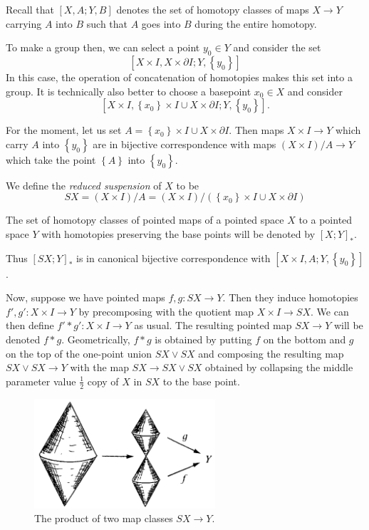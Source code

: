 Recall that $\left[ X,A ; Y ,B \right] $ denotes the
set of homotopy classes of maps $X \to Y$ carrying $A$ into
$B$ such that $A$ goes into $B$ during the entire homotopy.

To make a group then, we can select a point $y_0 \in Y$ and
consider the set
\[
\left[ X \times I, X \times \partial I ;
Y , \left\{ y_0 \right\} \right] 
\] 
In this case, the operation of concatenation of homotopies
makes this set into a group.
It is technically also better to choose a basepoint 
$x_0 \in X$ and consider
\[
\left[ X \times I, \left\{ x_0 \right\} \times I
\cup X \times \partial I ; Y , \left\{ y_0 \right\} \right] .
\] 

For the moment, let us set
$A = \left\{ x_0 \right\} \times I \cup 
X \times \partial I$. Then maps
$X \times I \to Y$ which carry $A$ into $\left\{ y_0 \right\} $ 
are in bijective correspondence with maps 
$\left( X \times I \right) / A \to Y$ which take
 the point $\left\{ A \right\} $ into 
 $\left\{ y_0 \right\} $. 
 
 \begin{definition}
     We define the \textit{reduced suspension} of
     $X$ to be
     \[
     SX = (X \times I) / A =
     \left( X \times I \right) /
     \left( \left\{ x_0 \right\} \times I
     \cup X \times \partial I \right) 
     \] 
 \end{definition}

 The set of homotopy classes of pointed maps
 of a pointed space $X$ to a pointed space $Y$ with
 homotopies preserving the base points will
 be denoted by $\left[ X;Y \right]_* $. 

 Thus
 $\left[ SX;Y \right]_* $ is in canonical bijective
 correspondence with
 $\left[ X \times I, A ; Y , \left\{ y_0 \right\}  \right] $.


 Now, suppose we have pointed maps
 $f,g \colon SX \to Y$. Then they
 induce homotopies
 $f',g' \colon X \times I \to Y$ by precomposing with the
 quotient map
  $X\times I \to SX$. We can then define
  $f' * g' \colon X \times I \to Y$ as usual.
  The resulting pointed map
  $SX \to Y$ will be denoted $f * g$.
  Geometrically, $f * g$ is obtained by
  putting $f$ on the bottom and $g$ on the top
  of the one-point union $SX \vee SX$ and composing
  the resulting map $SX \vee SX \to Y$ with the
  map $SX \to SX \vee SX$ obtained by collapsing the
  middle parameter value $\frac{1}{2}$ copy of
  $X$ in $SX$ to the base point.
  
  \begin{figure}[htpb]
      \centering
      \includegraphics[width=0.6\textwidth]{Figures/TKISO0932.png}
      \caption{The product of two map classes
      $SX \to Y$.}
      \label{fig:TKISO0932-png}
  \end{figure}


